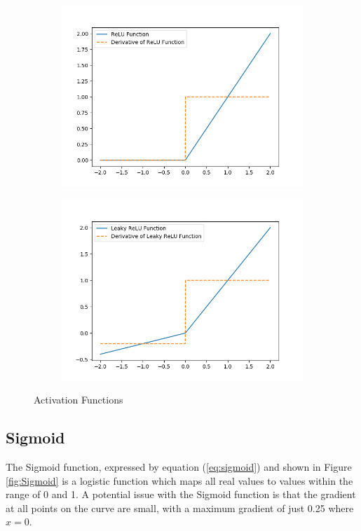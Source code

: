 \begin{figure}[h]
\begin{subfigure}[b]{0.49\textwidth}
        \includegraphics[width=\textwidth]{figures/relu.png}
        \label{fig:ReLU}
    \end{subfigure}
    \begin{subfigure}[b]{0.49\textwidth}
        \includegraphics[width=\textwidth]{figures/lrelu.png}
        \label{fig:LeakyReLU}
    \end{subfigure}
    \caption{Activation Functions}\label{fig:activations}
\end{figure}

\subsection{Sigmoid}
The Sigmoid function, expressed by equation (\ref{eq:sigmoid}) and shown in Figure \ref{fig:Sigmoid} is a logistic function which maps all real values to values within the range of 0 and 1.
A potential issue with the Sigmoid function is that the gradient at all points on the curve are small, with a maximum gradient of just 0.25 where $x = 0$.

